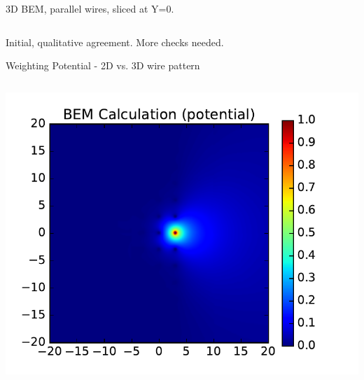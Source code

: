 \documentclass[xcolor=dvipsnames]{beamer}
\begin{document}
\begin{frame}
\begin{columns}
\begin{column}{0.5\textwidth}
\begin{center}
        \scriptsize 3D BEM, parallel wires, sliced at Y=0.
      \end{center}
    \end{column}
  \end{columns}

  \begin{center}
    Initial, qualitative agreement.  More checks needed.
  \end{center}

\end{frame}

\begin{frame}{Weighting Potential - 2D vs. 3D wire pattern}

  \vspace{-5mm}

  \begin{columns}
    \begin{column}{0.5\textwidth}
      \begin{center}
        \includegraphics[height=0.65\textheight]{parallel-near-d11.pdf}


\end{center}
\end{column}
\end{columns}
\end{frame}
\end{document}

